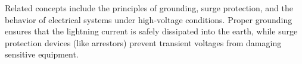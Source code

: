 Related concepts include the principles of grounding, surge protection, and the behavior of electrical systems under high-voltage conditions. Proper grounding ensures that the lightning current is safely dissipated into the earth, while surge protection devices (like arrestors) prevent transient voltages from damaging sensitive equipment.

